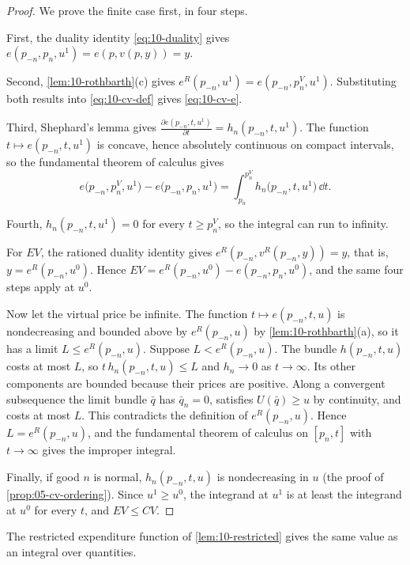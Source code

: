 \begin{proof}
We prove the finite case first, in four steps.

First, the duality identity \eqref{eq:10-duality} gives $e(p_{-n},p_n,u^1) = e(p,v(p,y)) = y$.

Second, \cref{lem:10-rothbarth}(c) gives $e^R(p_{-n},u^1) = e(p_{-n},p_n^V,u^1)$. Substituting both results
into \eqref{eq:10-cv-def} gives \eqref{eq:10-cv-e}.

Third, Shephard's lemma gives $\frac{\partial e(p_{-n},t,u^1)}{\partial t} = h_n(p_{-n},t,u^1)$. The function
$t \mapsto e(p_{-n},t,u^1)$ is concave, hence absolutely continuous on compact intervals, so the fundamental
theorem of calculus gives
\begin{equation*}
  e\bigl(p_{-n},p_n^V,u^1\bigr) - e\bigl(p_{-n},p_n,u^1\bigr) = \int_{p_n}^{p_n^V}h_n\bigl(p_{-n},t,u^1\bigr)\,\dd t.
\end{equation*}

Fourth, $h_n(p_{-n},t,u^1) = 0$ for every $t \ge p_n^V$, so the integral can run to infinity.

For $EV$, the rationed duality identity gives $e^R(p_{-n},v^R(p_{-n},y)) = y$, that is,
$y = e^R(p_{-n},u^0)$. Hence $EV = e^R(p_{-n},u^0) - e(p_{-n},p_n,u^0)$, and the same four steps apply at
$u^0$.

Now let the virtual price be infinite. The function $t \mapsto e(p_{-n},t,u)$ is nondecreasing and bounded
above by $e^R(p_{-n},u)$ by \cref{lem:10-rothbarth}(a), so it has a limit $L \le e^R(p_{-n},u)$. Suppose
$L < e^R(p_{-n},u)$. The bundle $h(p_{-n},t,u)$ costs at most $L$, so $t\,h_n(p_{-n},t,u) \le L$ and
$h_n \to 0$ as $t \to \infty$. Its other components are bounded because their prices are positive. Along a
convergent subsequence the limit bundle $\bar q$ has $\bar q_n = 0$, satisfies $U(\bar q) \ge u$ by
continuity, and costs at most $L$. This contradicts the definition of $e^R(p_{-n},u)$. Hence
$L = e^R(p_{-n},u)$, and the fundamental theorem of calculus on $[p_n,t]$ with $t \to \infty$ gives the
improper integral.

Finally, if good $n$ is normal, $h_n(p_{-n},t,u)$ is nondecreasing in $u$ (the proof of
\cref{prop:05-cv-ordering}). Since $u^1 \ge u^0$, the integrand at $u^1$ is at least the integrand at $u^0$
for every $t$, and $EV \le CV$.
\end{proof}

The restricted expenditure function of \cref{lem:10-restricted} gives the same value as an integral over quantities.

